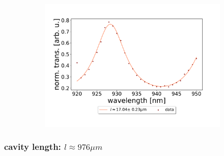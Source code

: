 \begin{figure}[h!] \ContinuedFloat
    \centering
    \begin{subfigure}[b]{0.49\textwidth}
        \includegraphics[width=\textwidth]{figures/results/double fano fits/30um_M3:M5_FSR_scan.pdf}
        \caption{}
        \label{fig:30um_M3:M5_FSR_scan}
    \end{subfigure}
\end{figure}

\clearpage
\subsubsection*{cavity length: $l \approx 976 \mu m$}


